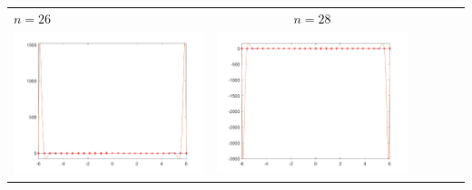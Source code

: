 \begin{tabular}{l*{5}{c}}
\hspace{3.5cm}\(n=26\) &  \(n=28\) \\
\includegraphics[scale=0.5]{cap4/4_9/26.png} &  \includegraphics[scale=0.5]{cap4/4_9/28.png} \\
\end{tabular}

